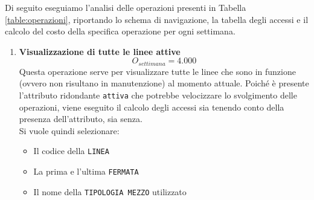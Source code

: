 \documentclass[12pt,a4paper]{report}
\begin{document}
\noindent Di seguito eseguiamo l'analisi delle operazioni presenti in Tabella \ref{table:operazioni}, riportando lo schema di navigazione, la tabella degli accessi e il calcolo del costo della specifica operazione per ogni settimana.
\begin{enumerate}[label=\textbf{\arabic*}]


   \item \textbf{Visualizzazione di tutte le linee attive} \label{op1} \\
    \[ {O_{settimana} = 4.000} \]
    Questa operazione serve per visualizzare tutte le linee che sono in funzione (ovvero non risultano in manutenzione) al momento attuale. Poiché è presente l'attributo ridondante  \texttt{attiva} che potrebbe velocizzare lo svolgimento delle operazioni, viene eseguito il calcolo degli accessi sia tenendo conto della presenza dell'attributo, sia senza.\\
    Si vuole quindi selezionare:
    \begin{itemize}
	\renewcommand\labelitemi{--}
    \item Il codice della \texttt{LINEA}
    \item La prima e l'ultima \texttt{FERMATA}
    \item Il nome della \texttt{TIPOLOGIA MEZZO} utilizzato
    \end{itemize}


\end{enumerate}
\end{document}

